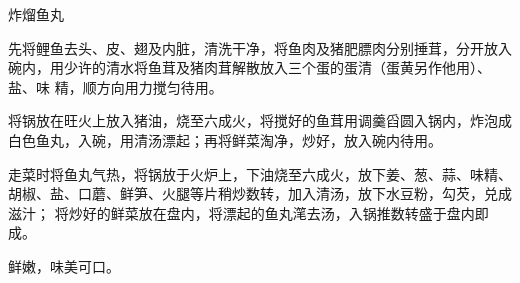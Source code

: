 %
%
%
%
%
%
%
\begin{recipe}{炸熘鱼丸}

\ingredients


\preparation

\step 先将鲤鱼去头、皮、翅及内脏，清洗干净，将鱼肉及猪肥膘肉分别捶茸，分开放入
碗内，用少许的清水将鱼茸及猪肉茸解散放入三个蛋的蛋清（蛋黄另作他用）、盐、味
精，顺方向用力搅匀待用。

\step 将锅放在旺火上放入猪油，烧至六成火，将搅好的鱼茸用调羹舀圆入锅内，炸泡成
白色鱼丸，入碗，用清汤漂起；再将鲜菜淘净，炒好，放入碗内待用。

\step 走菜时将鱼丸气热，将锅放于火炉上，下油烧至六成火，放下姜、葱、蒜、味精、
胡椒、盐、口蘑、鲜笋、火腿等片稍炒数转，加入清汤，放下水豆粉，勾芡，兑成滋汁；
将炒好的鲜菜放在盘内，将漂起的鱼丸滗去汤，入锅推数转盛于盘内即成。

\features

鲜嫩，味美可口。

\end{recipe}

